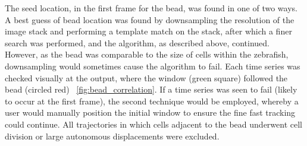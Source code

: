 
The seed location, in the first frame for the bead, was found in one of two ways.
A best guess of bead location was found by downsampling the resolution of the image stack and performing a template match on the stack, after which a finer search was performed, and the algorithm, as described above, continued.
However, as the bead was comparable to the size of cells within the zebrafish, downsampling would sometimes cause the algorithm to fail.
Each time series was checked visually at the output, where the window (green square) followed the bead (circled red) \figurename~\ref{fig:bead_correlation}.
If a time series was seen to fail (likely to occur at the first frame), the second technique would be employed, whereby a user would manually position the initial window to ensure the fine fast tracking could continue.
All trajectories in which cells adjacent to the bead underwent cell division or large autonomous displacements were excluded.


